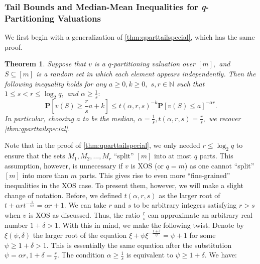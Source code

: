 \documentclass[11pt]{article}\usepackage{amsfonts}
\newtheorem{theorem}{Theorem}
\numberwithin{theorem}{subsection}
\newcommand{\prob}{\mathbf{P}}
\def\hmath$#1${\texorpdfstring{{\rmfamily\textit{#1}}}{#1}}
\begin{document}
\subsubsection{Tail Bounds and Median-Mean Inequalities for \hmath$q$-Partitioning Valuations}
We first begin with a generalization of \cref{thm:qparttailspecial}, which has the same proof. 
\begin{theorem}
\label{thm:qparttail}
Suppose that $v$ is a $q$-partitioning valuation over $[m],$ and $S\subseteq [m]$ is a random set in which each element appears independently. Then the following inequality holds for any $ a \ge 0, k\ge 0,$ $s,r\in \mathbb{N}$ such that $1\le s < r\le \log_2 q,$ and $\alpha \ge \frac{1}{s}:$  
    $$
    \prob[v(S)\ge \frac{r}{s}a+k]\le 
    t(\alpha, r, s)^{-k}\prob[v(S)\le a]^{-\alpha r}.
    $$
    In particular, choosing $a$ to be the median, $\alpha = \frac{1}{s}, t(\alpha, r, s) = \frac{r}{s},$ we recover \cref{thm:qparttailspecial}.
\end{theorem}

\noindent
Note that in the proof of \cref{thm:qparttailspecial}, we only needed $r\le \log_2 q$ to ensure that the sets $M_1, M_2, \ldots, M_r$ ``split'' $[m]$ into at most $q$ parts. This assumption, however, is unnecessary if $v$ is XOS (or $q = m$) as one cannot ``split'' $[m]$ into more than $m$ parts. This gives rise to even more ``fine-grained'' inequalities in the XOS case. To present them, however, we will make a slight change of notation. Before, we defined $t(\alpha, r,s)$ as the larger root of $t + \alpha r t^{-\frac{1}{\alpha s}} = \alpha r + 1.$
We can take $r$ and $s$ to be arbitrary integers satisfying $r>s$ when $v$ is XOS as discussed. Thus, the ratio $\frac{r}{s}$ can approximate an arbitrary real number $1+ \delta > 1.$ With this in mind, we make the following twist. Denote by $\xi(\psi, \delta)$ the larger root of the equation $\xi + \psi \xi^{-\frac{1+\delta}{\psi}} = \psi+1$ for some $\psi \ge 1+\delta >1.$ This is essentially the same equation after the substitution $\psi =\alpha r, 1+ \delta = \frac{r}{s}.$ The condition $\alpha \ge \frac{1}{s}$ is equivalent to $\psi \ge 1+\delta.$
We have:
\end{document}
